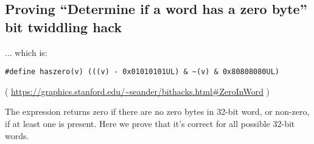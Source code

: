 \subsection{Proving ``Determine if a word has a zero byte'' bit twiddling hack}

... which is:

\begin{lstlisting}
#define haszero(v) (((v) - 0x01010101UL) & ~(v) & 0x80808080UL)
\end{lstlisting}

( \url{https://graphics.stanford.edu/~seander/bithacks.html#ZeroInWord} )

The expression returns zero if there are no zero bytes in 32-bit word, or non-zero, if at least one is present.
Here we prove that it's correct for all possible 32-bit words.



